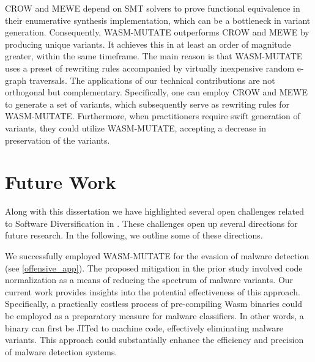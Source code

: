 \begin{strategy}
    CROW and MEWE depend on SMT solvers to prove functional equivalence in their enumerative synthesis implementation, which can be a bottleneck in variant generation. 
    Consequently, WASM-MUTATE outperforms CROW and MEWE by producing unique variants. 
    It achieves this in at least an order of magnitude greater, within the same timeframe.   
    The main reason is that WASM-MUTATE uses a preset of rewriting rules accompanied by virtually inexpensive random e-graph traversals.
    The applications of our technical contributions are not orthogonal but complementary. 
    Specifically, one can employ CROW and MEWE to generate a set of variants, which subsequently serve as rewriting rules for WASM-MUTATE. 
    Furthermore, when practitioners require swift generation of variants, they could utilize WASM-MUTATE, accepting a decrease in preservation of the variants.
\end{strategy}


\section{Future Work}

Along with this dissertation we have highlighted several open challenges related to Software Diversification in \Wasm.
These challenges open up several directions for future research.
In the following, we outline some of these directions.



\begin{strategy}
     We successfully employed WASM-MUTATE for the evasion of malware detection (see \autoref{offensive_app}). 
    The proposed mitigation in the prior study involved code normalization as a means of reducing the spectrum of malware variants. 
    Our current work provides insights into the potential effectiveness of this approach. 
    Specifically, a practically costless process of pre-compiling Wasm binaries could be employed as a preparatory measure for malware classifiers. 
    In other words, a \wasm binary can first be JITed to machine code, effectively eliminating malware variants. 
    This approach could substantially enhance the efficiency and precision of malware detection systems.



\end{strategy}

